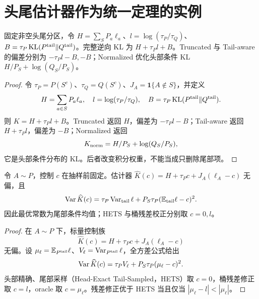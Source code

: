 \section{头尾估计器作为统一定理的实例}
\begin{proposition}[三种确定性头部目标及其偏差]
固定非空头尾分区，令 $H=\sum_SP_a\ell_a$、$l=\log(\tau_P/\tau_Q)$、$B=\tau_P\operatorname{KL}(P^{\rm tail}\Vert Q^{\rm tail})$。完整逆向 KL 为 $H+\tau_Pl+B$。Truncated 与 Tail-aware 的偏差分别为 $-\tau_Pl-B,-B$；Normalized 优化头部条件 KL $H/P_S+\log(Q_S/P_S)$。
\end{proposition}
\begin{proof}
令 $\tau_P=P(S^c)$、$\tau_Q=Q(S^c)$、$J_A=\mathbf1\{A\notin S\}$，并定义
\begin{equation}
H=\sum_{a\in S}P_a\ell_a,\quad
l=\log(\tau_P/\tau_Q),\quad
B=\tau_P\operatorname{KL}(P^{\rm tail}\Vert Q^{\rm tail}).
\end{equation}
则 $K=H+\tau_Pl+B$。Truncated 返回 $H$，偏差为 $-\tau_Pl-B$；Tail-aware 返回 $H+\tau_Pl$，偏差为 $-B$；Normalized 返回
\begin{equation}
K_{\rm norm}=H/P_S+\log(Q_S/P_S),
\end{equation}
它是头部条件分布的 KL。后者改变积分权重，不能当成只删除尾部项。
\end{proof}

\begin{proposition}[标量尾部控制族的精确方差]
令 $A\sim P$，控制 $c$ 在抽样前固定。估计器 $\widehat K(c)=H+\tau_Pc+J_A(\ell_A-c)$ 无偏，且
\begin{equation}
\operatorname{Var}\widehat K(c)=\tau_P\operatorname{Var}_{\rm tail}\ell+P_S\tau_P(\mathbb E_{\rm tail}\ell-c)^2.
\end{equation}
因此最优常数为尾部条件均值；HETS 与桶残差校正分别取 $c=0,l$。
\end{proposition}
\begin{proof}
在 $A\sim P$ 下，标量控制族
\begin{equation}
\widehat K(c)=H+\tau_Pc+J_A(\ell_A-c)
\end{equation}
无偏。设 $\mu_\ell=\mathbb E_{P^{\rm tail}}\ell$、$V_\ell=\operatorname{Var}_{P^{\rm tail}}\ell$，全方差公式给出
\begin{equation}
\operatorname{Var}\widehat K(c)=\tau_PV_\ell+P_S\tau_P(\mu_\ell-c)^2.
\end{equation}
头部精确、尾部采样（Head-Exact Tail-Sampled，HETS）取 $c=0$，桶残差修正取 $c=l$，oracle 取 $c=\mu_\ell$。残差修正优于 HETS 当且仅当 $|\mu_\ell-l|<|\mu_\ell|$。
\end{proof}

